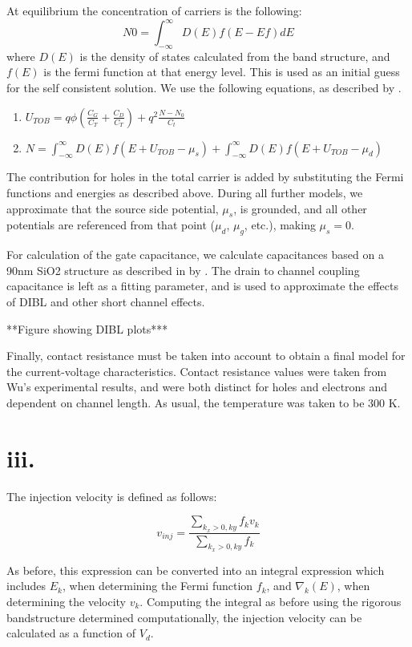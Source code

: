 \documentclass[11pt]{article}
\begin{document}
At equilibrium the concentration of carriers is the following:
$$N0 = \int_{-\infty}^{\infty}{D(E)f(E-Ef)dE}$$
where $D(E)$ is the density of states calculated from the band structure, and $f(E)$ is the fermi function at that energy level. This is used as an initial guess for the self consistent solution. We use the following equations, as described by \cite{ballistic2002}. 

\begin{enumerate}
\item $U_{TOB} = q\phi(\frac{C_G}{C_T} + \frac{C_D}{C_T}) + q^2\frac{N-N_0}{C_t}$ 
\item $N = \int_{-\infty}^{\infty}{D(E)f(E+U_{TOB}-\mu_s)} + \int_{-\infty}^{\infty}{D(E)f(E+U_{TOB}-\mu_d)}$
\end{enumerate}

The contribution for holes in the total carrier is added by substituting the Fermi functions and energies as described above. During all further models, we approximate that the source side potential, $\mu_s$, is grounded, and all other potentials are referenced from that point ($\mu_d$, $\mu_g$, etc.), making $\mu_s = 0$. 

For calculation of the gate capacitance, we calculate capacitances based on a 90nm SiO2 structure as described in by \cite{wu2010}. The drain to channel coupling capacitance is left as a fitting parameter, and is used to approximate the effects of DIBL and other short channel effects. 

**Figure showing DIBL plots***

Finally, contact resistance must be taken into account to obtain a final model for the current-voltage characteristics. Contact resistance values were taken from Wu's experimental results, and were both distinct for holes and electrons and dependent on channel length. As usual, the temperature was taken to be 300 K.

\section*{iii.} The injection velocity is defined as follows:

$$v_{inj} = \frac{\sum_{k_x>0, ky}f_{k}v_{k}}{\sum_{k_x>0, ky}f_{k}}$$

As before, this expression can be converted into an integral expression which includes $E_k$, when determining the Fermi function $f_{k}$, and $\nabla_k(E)$, when determining the velocity $v_{k}$.  Computing the integral as before using the rigorous bandstructure determined computationally, the injection velocity can be calculated as a function of $V_d$.
\end{document}
